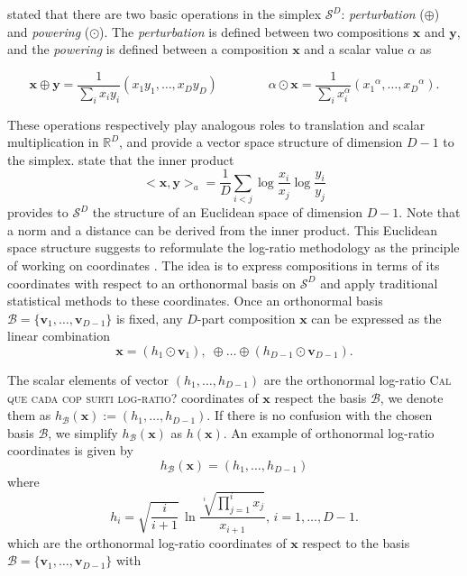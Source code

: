 \documentclass[10pt, a4paper]{article}
\begin{document}
 \noindent \cite{aitchison1986statistical} stated that  there are two basic operations in the simplex $\mathcal{S}^D$: \emph{perturbation} ($\oplus$) and 
 \emph{powering} ($\odot$). The \emph{perturbation} is defined between two compositions $\textbf{x}$ 
and $\textbf{y}$,  and the \emph{powering} is defined between a composition $\textbf{x}$ and a scalar value $\alpha$ as

\begin{equation}
\textbf{x} \oplus \textbf{y} =  \frac{1}{\sum_i x_i y_i}( x_1 y_1, \dots, x_D y_D) \qquad\qquad \alpha
 \odot \textbf{x} =  \frac{1}{\sum_i x_i^\alpha}( {x_1}^\alpha, \dots, {x_D}^\alpha).
\label{pert_pow}
\end{equation}

These operations respectively play analogous roles to translation and scalar multiplication in $\mathbb{R}^D$, and provide a vector space
structure of dimension $D-1$ to the simplex. \cite{pawlowsky2001geometric} state that the inner product 
\begin{equation}
<\textbf{x}, \textbf{y}>_a = \frac{1}{D} \sum_{i < j} \log \frac{x_i}{x_j} \log \frac{y_i}{y_j}
\label{inner_prod}
\end{equation}
 provides to $\mathcal{S}^D$ the structure of an Euclidean space of dimension $D-1$. Note that a norm and a distance can be derived from the inner product.
This Euclidean space structure suggests to reformulate the log-ratio methodology as the principle of working on coordinates \citep{mateu2011principle}. The idea is to express compositions in terms of its coordinates with respect to an orthonormal basis on $\mathcal{S}^D$ and apply
traditional statistical methods to these coordinates. Once an orthonormal basis $\mathcal{B} = \{\textbf{v}_1, \dots, \textbf{v}_{D-1}\}$ is fixed, any $D$-part composition $\textbf{x}$ can be expressed as the linear combination
\[
\textbf{x} = (h_1 \odot \textbf{v}_1),\; \oplus \dots  \oplus (h_{D-1} \odot \textbf{v}_{D-1}).
\]

The scalar elements of vector $(h_1, \dots, h_{D-1})$ are the orthonormal log-ratio \textsc{\color{red}Cal que cada cop surti log-ratio?} coordinates of $\textbf{x}$ respect the basis $\mathcal{B}$, we denote them as $h_\mathcal{B}(\textbf{x}) := (h_1, \dots, h_{D-1})$. If there is no confusion with the chosen basis $\mathcal{B}$, we simplify $h_\mathcal{B}(\textbf{x})$ as $h(\textbf{x})$. An example of orthonormal log-ratio coordinates  \citep{egozcue2003isometric} is given by
\[
h_\mathcal{B}(\textbf{x}) = (h_1, \dots, h_{D-1})
\]
where
\begin{equation}
\label{eilr}
h_i=\sqrt{\frac{i}{i+1}}\,\ln\frac{\sqrt[i]
{\prod_{j=1}^{i} x_j}}{x_{i+1}},\,i=1,\dots,D-1.
\end{equation}
which are the orthonormal log-ratio coordinates of $\textbf{x}$ respect to the basis $\mathcal{B} = \{\textbf{v}_1, \dots, \textbf{v}_{D-1}\}$ with
\end{document}
